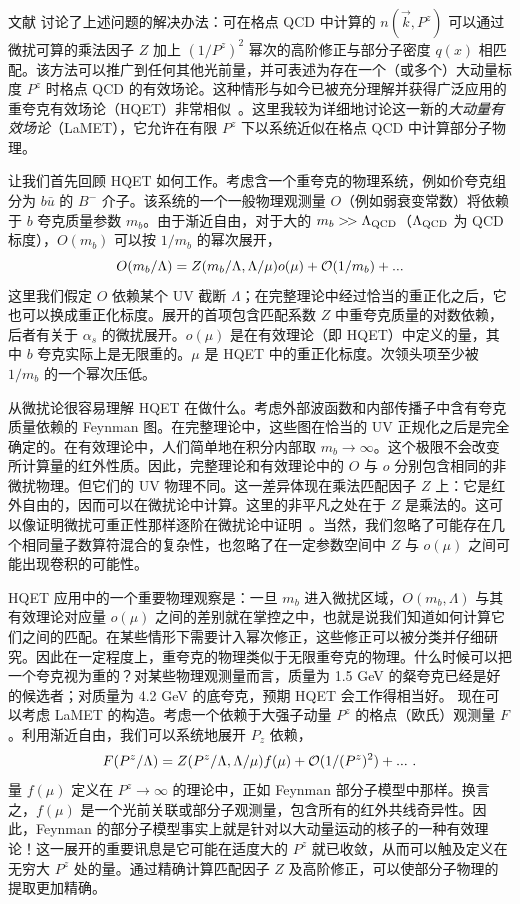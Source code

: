 文献 \cite{Ji:2013dva} 讨论了上述问题的解决办法：可在格点 QCD 中计算的 $n(\vec{k}, P^z)$ 可以通过微扰可算的乘法因子 $Z$ 加上 $(1/P^z)^2$ 幂次的高阶修正与部分子密度 $q(x)$ 相匹配。该方法可以推广到任何其他光前量，并可表述为存在一个（或多个）大动量标度 $P^z$ 时格点 QCD 的有效场论。这种情形与如今已被充分理解并获得广泛应用的重夸克有效场论（HQET）非常相似~\cite{Manohar:2000dt}。这里我较为详细地讨论这一新的{\it 大动量有效场论}（LaMET），它允许在有限 $P^z$ 下以系统近似在格点 QCD 中计算部分子物理。

让我们首先回顾 HQET 如何工作。考虑含一个重夸克的物理系统，例如价夸克组分为 $b\bar u$ 的 $B^-$ 介子。该系统的一个一般物理观测量 $O$（例如弱衰变常数）将依赖于 $b$ 夸克质量参数 $m_b$。由于渐近自由，对于大的 $m_b>\!>\Lambda_{\rm QCD}$（$\Lambda_{\rm QCD}$ 为 QCD 标度），$O(m_b)$ 可以按 $1/m_b$ 的幂次展开，
\begin{equation}
             O(m_b/\Lambda) = Z(m_b/\Lambda, \Lambda/\mu)o(\mu) + {\cal O}(1/m_b)+ ...
\end{equation}
这里我们假定 $O$ 依赖某个 UV 截断 $\Lambda$；在完整理论中经过恰当的重正化之后，它也可以换成重正化标度。展开的首项包含匹配系数 $Z$ 中重夸克质量的对数依赖，后者有关于 $\alpha_s$ 的微扰展开。$o(\mu)$ 是在有效理论（即 HQET）中定义的量，其中 $b$ 夸克实际上是无限重的。$\mu$ 是 HQET 中的重正化标度。次领头项至少被 $1/m_b$ 的一个幂次压低。

从微扰论很容易理解 HQET 在做什么。考虑外部波函数和内部传播子中含有夸克质量依赖的 Feynman 图。在完整理论中，这些图在恰当的 UV 正规化之后是完全确定的。在有效理论中，人们简单地在积分内部取 $m_b\rightarrow \infty$。这个极限不会改变所计算量的红外性质。因此，完整理论和有效理论中的 $O$ 与 $o$ 分别包含相同的非微扰物理。但它们的 UV 物理不同。这一差异体现在乘法匹配因子 $Z$ 上：它是红外自由的，因而可以在微扰论中计算。这里的非平凡之处在于 $Z$ 是乘法的。这可以像证明微扰可重正性那样逐阶在微扰论中证明~\cite{Collins:1984xc}。当然，我们忽略了可能存在几个相同量子数算符混合的复杂性，也忽略了在一定参数空间中 $Z$ 与 $o(\mu)$ 之间可能出现卷积的可能性。

HQET 应用中的一个重要物理观察是：一旦 $m_b$ 进入微扰区域，$O(m_b, \Lambda)$ 与其有效理论对应量 $o(\mu)$ 之间的差别就在掌控之中，也就是说我们知道如何计算它们之间的匹配。在某些情形下需要计入幂次修正，这些修正可以被分类并仔细研究。因此在一定程度上，重夸克的物理类似于无限重夸克的物理。什么时候可以把一个夸克视为重的？对某些物理观测量而言，质量为 1.5 GeV 的粲夸克已经是好的候选者；对质量为 4.2 GeV 的底夸克，预期 HQET 会工作得相当好。
现在可以考虑 LaMET 的构造。考虑一个依赖于大强子动量 $P^z$ 的格点（欧氏）观测量 $F$。利用渐近自由，我们可以系统地展开 $P_z$ 依赖，
\begin{equation}
             F(P^z/\Lambda) = Z(P^z/\Lambda, \Lambda/\mu)f(\mu) + {\cal O}(1/(P^z)^2)+ ... \ .
\label{Eq:Expansion}
\end{equation}
量 $f(\mu)$ 定义在 $P^z\rightarrow \infty$ 的理论中，正如 Feynman 部分子模型中那样。换言之，$f(\mu)$ 是一个光前关联或部分子观测量，包含所有的红外共线奇异性。因此，Feynman 的部分子模型事实上就是针对以大动量运动的核子的一种有效理论！这一展开的重要讯息是它可能在适度大的 $P^z$ 就已收敛，从而可以触及定义在无穷大 $P^z$ 处的量。通过精确计算匹配因子 $Z$ 及高阶修正，可以使部分子物理的提取更加精确。

